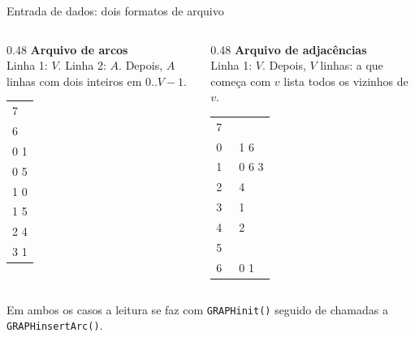 \documentclass[aspectratio=169]{beamer}
\begin{document}
\begin{frame}{Entrada de dados: dois formatos de arquivo}
  \begin{columns}[T]
    \begin{column}{0.48\textwidth}
      {\small \textbf{Arquivo de arcos}}\\
      {\scriptsize Linha 1: $V$. Linha 2: $A$. Depois, $A$ linhas com dois
      inteiros em $0..V-1$.}
      \begin{center}\ttfamily\scriptsize
      \begin{tabular}{l}
        7 \\ 6 \\ 0 1 \\ 0 5 \\ 1 0 \\ 1 5 \\ 2 4 \\ 3 1 \\
      \end{tabular}
      \end{center}
    \end{column}
    \begin{column}{0.48\textwidth}
      {\small \textbf{Arquivo de adjacências}}\\
      {\scriptsize Linha 1: $V$. Depois, $V$ linhas: a que começa com $v$ lista
      todos os vizinhos de $v$.}
      \begin{center}\ttfamily\scriptsize
      \begin{tabular}{l}
        7 \\ 0\ \ \ 1 6 \\ 1\ \ \ 0 6 3 \\ 2\ \ \ 4 \\ 3\ \ \ 1 \\ 4\ \ \ 2 \\ 5 \\ 6\ \ \ 0 1 \\
      \end{tabular}
      \end{center}
    \end{column}
  \end{columns}
  {\scriptsize Em ambos os casos a leitura se faz com \texttt{GRAPHinit()} seguido de
  chamadas a \texttt{GRAPHinsertArc()}.}
\end{frame}
\end{document}
